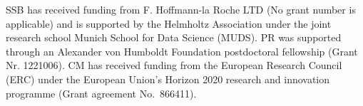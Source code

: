 SSB has received funding from F. Hoffmann-la Roche LTD (No grant number
is applicable) and is supported by the Helmholtz Association under the
joint research school Munich School for Data Science (MUDS). PR was
supported through an Alexander von Humboldt Foundation postdoctoral
fellowship (Grant Nr. 1221006). CM has received funding from the
European Research Council (ERC) under the European Union's Horizon 2020
research and innovation programme (Grant agreement No.~866411).
